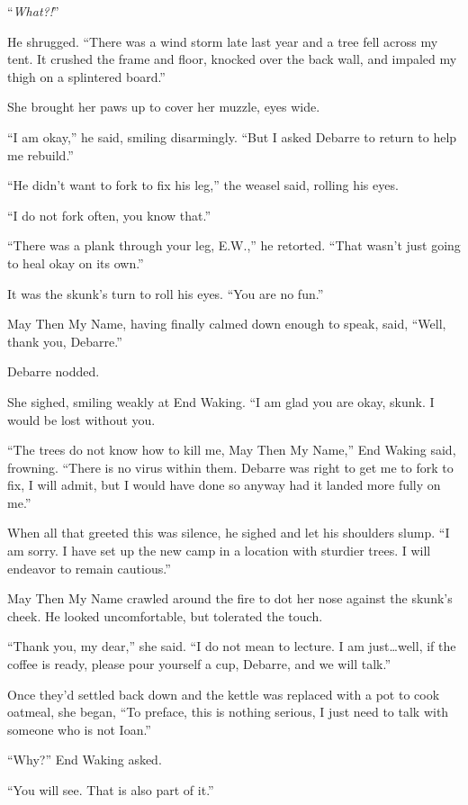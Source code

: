 ``\emph{What?!}''

He shrugged. ``There was a wind storm late last year and a tree fell across my tent. It crushed the frame and floor, knocked over the back wall, and impaled my thigh on a splintered board.''

She brought her paws up to cover her muzzle, eyes wide.

``I am okay,'' he said, smiling disarmingly. ``But I asked Debarre to return to help me rebuild.''

``He didn't want to fork to fix his leg,'' the weasel said, rolling his eyes.

``I do not fork often, you know that.''

``There was a plank through your leg, E.W.,'' he retorted. ``That wasn't just going to heal okay on its own.''

It was the skunk's turn to roll his eyes. ``You are no fun.''

May Then My Name, having finally calmed down enough to speak, said, ``Well, thank you, Debarre.''

Debarre nodded.

She sighed, smiling weakly at End Waking. ``I am glad you are okay, skunk. I would be lost without you.

``The trees do not know how to kill me, May Then My Name,'' End Waking said, frowning. ``There is no virus within them. Debarre was right to get me to fork to fix, I will admit, but I would have done so anyway had it landed more fully on me.''

When all that greeted this was silence, he sighed and let his shoulders slump. ``I am sorry. I have set up the new camp in a location with sturdier trees. I will endeavor to remain cautious.''

May Then My Name crawled around the fire to dot her nose against the skunk's cheek. He looked uncomfortable, but tolerated the touch.

``Thank you, my dear,'' she said. ``I do not mean to lecture. I am just\ldots well, if the coffee is ready, please pour yourself a cup, Debarre, and we will talk.''

Once they'd settled back down and the kettle was replaced with a pot to cook oatmeal, she began, ``To preface, this is nothing serious, I just need to talk with someone who is not Ioan.''

``Why?'' End Waking asked.

``You will see. That is also part of it.''

